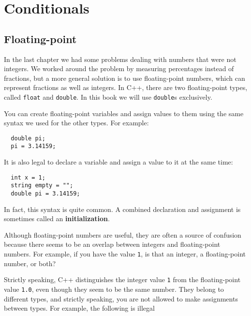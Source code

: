 

\chapter{Conditionals}
\label{conditional}

\section{Floating-point}
\label{floating-point}

In the last chapter we had some problems dealing with numbers
that were not integers.  We worked around the problem by measuring
percentages instead of fractions, but a more general solution is
to use floating-point numbers, which can represent fractions
as well as integers.  In C++, there are two floating-point types,
called {\tt float} and {\tt double}.  In this book we will use
{\tt double}s exclusively.

You can create floating-point variables and assign values to them
using the same syntax we used for the other types.  For example:

\begin{lstlisting}
  double pi;
  pi = 3.14159;
\end{lstlisting}
%
It is also legal to declare a variable and assign a value to it at the
same time:

\begin{lstlisting}
  int x = 1;
  string empty = "";
  double pi = 3.14159;
\end{lstlisting}
%
In fact, this syntax is quite common.  A combined declaration
and assignment is sometimes called an {\bf initialization}.


Although floating-point numbers are useful, they are
often a source of confusion because there seems to be an
overlap between integers and floating-point numbers.  For
example, if you have the value {\tt 1}, is that an integer,
a floating-point number, or both?

Strictly speaking, C++ distinguishes the integer value {\tt 1}
from the floating-point value {\tt 1.0}, even though they
seem to be the same number.  They belong to
different types, and strictly speaking, you are not allowed
to make assignments between types.  For example, the following
is illegal


